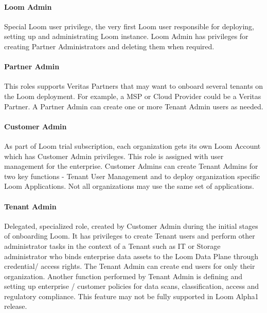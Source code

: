 \documentclass[letterpaper,10pt,english]{sphinxmanual}
\begin{document}
\paragraph{Loom Admin}
\label{\detokenize{loom_getting_started_guide:loom-admin}}
Special Loom user privilege, the very first Loom user responsible for deploying, setting up and administrating Loom instance. Loom Admin has privileges for creating Partner Administrators and deleting them when required.


\paragraph{Partner Admin}
\label{\detokenize{loom_getting_started_guide:partner-admin}}
This roles supports Veritas Partners that may want to onboard several tenants on the Loom deployment. For example, a MSP or Cloud Provider could be a Veritas Partner. A Partner Admin can create one or more Tenant Admin users as needed.


\paragraph{Customer Admin}
\label{\detokenize{loom_getting_started_guide:customer-admin}}
As part of Loom trial subscription, each organization gets its own Loom Account which has Customer Admin privileges. This role is assigned with user management for the enterprise. Customer Admins can create Tenant Admins for two key functions - Tenant User Management and to deploy organization specific Loom Applications. Not all organizations may use the same set of applications.


\paragraph{Tenant Admin}
\label{\detokenize{loom_getting_started_guide:tenant-admin}}
Delegated, specialized role, created by Customer Admin during the initial stages of onboarding Loom. It has privileges to create Tenant users and perform other administrator tasks in the context of a Tenant such as IT or Storage administrator who binds enterprise data assets to the Loom Data Plane through credential/ access rights. The Tenant Admin can create end users for only their organization. Another function performed by Tenant Admin is defining and setting up enterprise / customer policies for data scans, classification, access and regulatory compliance. This feature may not be fully supported in Loom Alpha1 release.
\end{document}
